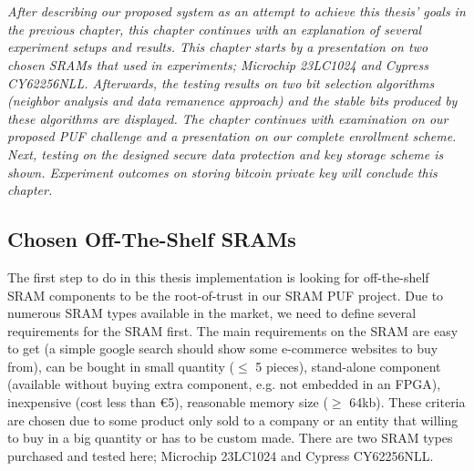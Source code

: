 \chapter{\chapterFive}
\label{chp:5}

\textit{After describing our proposed system as an attempt to achieve this thesis' goals in the previous chapter, this chapter continues with an explanation of several experiment setups and results. This chapter starts by a presentation on two chosen SRAMs that used in experiments; Microchip 23LC1024 and Cypress CY62256NLL. Afterwards, the testing results on two bit selection algorithms (neighbor analysis and data remanence approach) and the stable bits produced by these algorithms are displayed. The chapter continues with examination on our proposed PUF challenge and a presentation on our complete enrollment scheme. Next, testing on the designed secure data protection and key storage scheme is shown. Experiment outcomes on storing bitcoin private key will conclude this chapter.}

\section{Chosen Off-The-Shelf SRAMs}
The first step to do in this thesis implementation is looking for off-the-shelf SRAM components to be the root-of-trust in our SRAM PUF project.
Due to numerous SRAM types available in the market, we need to define several requirements for the SRAM first. The main requirements on the SRAM are easy to get (a simple google search should show some e-commerce websites to buy from), can be bought in small quantity ($\leq$ 5 pieces), stand-alone component (available without buying extra component, e.g. not embedded in an FPGA), inexpensive (cost less than \euro{}5), reasonable memory size ($\geq$ 64kb). These criteria are chosen due to some product only sold to a company or an entity that willing to buy in a big quantity or has to be custom made. There are two SRAM types purchased and tested here; Microchip 23LC1024 and Cypress CY62256NLL.

%
